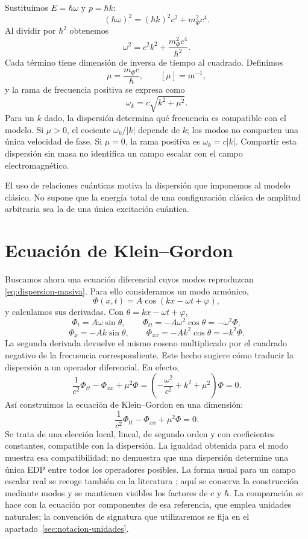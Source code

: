 Sustituimos $E=\hbar\omega$ y $p=\hbar k$:
\[
(\hbar\omega)^2=(\hbar k)^2c^2+m_\Phi^2c^4.
\]
Al dividir por $\hbar^2$ obtenemos
\begin{equation}
\omega^2=c^2k^2+\frac{m_\Phi^2c^4}{\hbar^2}.
\label{eq:dispersion-masiva}
\end{equation}
Cada término tiene dimensión de inversa de tiempo al cuadrado. Definimos
\[
\mu=\frac{m_\Phi c}{\hbar},\qquad [\mu]=\mathrm{m}^{-1},
\]
y la rama de frecuencia positiva se expresa como
\[
\omega_k=c\sqrt{k^2+\mu^2}.
\]
Para un $k$ dado, la dispersión determina qué frecuencia es compatible con
el modelo. Si $\mu>0$, el cociente $\omega_k/|k|$ depende de $k$; los modos
no comparten una única velocidad de fase. Si $\mu=0$, la rama positiva es
$\omega_k=c|k|$. Compartir esta dispersión sin masa no identifica un campo
escalar con el campo electromagnético.

El uso de relaciones cuánticas motiva la dispersión que imponemos al modelo
clásico. No supone que la energía total de una configuración clásica de
amplitud arbitraria sea la de una única excitación cuántica.

\section{Ecuación de Klein--Gordon}

Buscamos ahora una ecuación diferencial cuyos modos reproduzcan
\eqref{eq:dispersion-masiva}. Para ello consideramos un modo armónico,
\[
\Phi(x,t)=A\cos(kx-\omega t+\varphi),
\]
y calculamos sus derivadas. Con $\theta=kx-\omega t+\varphi$,
\[
\Phi_t=A\omega\sin\theta,\qquad
\Phi_{tt}=-A\omega^2\cos\theta=-\omega^2\Phi,
\]
\[
\Phi_x=-Ak\sin\theta,\qquad
\Phi_{xx}=-Ak^2\cos\theta=-k^2\Phi.
\]
La segunda derivada devuelve el mismo coseno multiplicado por el cuadrado
negativo de la frecuencia correspondiente. Este hecho sugiere cómo traducir
la dispersión a un operador diferencial. En efecto,
\[
\frac1{c^2}\Phi_{tt}-\Phi_{xx}+\mu^2\Phi
=\left(-\frac{\omega^2}{c^2}+k^2+\mu^2\right)\Phi=0.
\]
Así construimos la ecuación de Klein--Gordon en una dimensión:
\begin{equation}
\frac1{c^2}\Phi_{tt}-\Phi_{xx}+\mu^2\Phi=0.
\label{eq:kg-plana-1d}
\end{equation}
Se trata de una elección local, lineal, de segundo orden y con coeficientes
constantes, compatible con la dispersión. La igualdad obtenida para el modo
muestra esa compatibilidad; no demuestra que una dispersión determine una
única EDP entre todos los operadores posibles. La forma usual para un
campo escalar real se recoge también en la literatura
\cite[\S1.1.1, ecuación (1.12)]{TongQFT}; aquí se conserva la construcción
mediante modos y se mantienen visibles los factores de $c$ y $\hbar$.
La comparación se hace con la ecuación por componentes de esa referencia,
que emplea unidades naturales; la convención de signatura que utilizaremos
se fija en el apartado~\ref{sec:notacion-unidades}.

